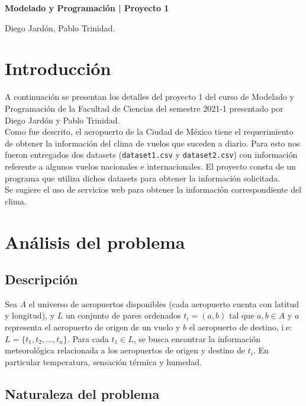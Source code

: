 \documentclass[10pt, letterpaper]{article}
\begin{document}
\begin{center}
    {\large \bfseries Modelado y Programación | Proyecto 1 \par}
    \vspace{0.2cm}
    Diego Jardón, Pablo Trinidad.
\end{center}

\section{Introducción}

A continuación se presentan los detalles del proyecto 1 del curso de Modelado y Programación
de la Facultad de Ciencias del semestre 2021-1 presentado por Diego Jardón y Pablo Trinidad.\\

Como fue descrito, el aeropuerto de la Ciudad de México tiene el requerimiento de obtener la
información del clima de vuelos que suceden a diario. Para esto nos fueron entregados dos datasets
(\texttt{dataset1.csv} y \texttt{dataset2.csv}) con información referente a algunos vuelos nacionales
e internacionales. El proyecto consta de un programa que utiliza dichos datasets para obtener la
información solicitada.\\

Se sugiere el uso de servicios web para obtener la información correspondiente del clima.

\section{Análisis del problema}

\subsection{Descripción}

Sea $A$ el universo de aeropuertos disponibles (cada aeropuerto cuenta con latitud y longitud),
y $L$ un conjunto de pares ordenados $t_i = (a, b)$ tal que $a, b \in A$ y $a$ representa
el aeropuerto de origen de un vuelo y $b$ el aeropuerto de destino, i.e:
$L = \{t_1, t_2, ..., t_n\}$. Para cada $t_1 \in L$, se busca encontrar la información meteorológica
relacionada a los aeropuertos de origen y destino de $t_i$. En particular temperatura, sensación
térmica y humedad.

\subsection{Naturaleza del problema}
\end{document}
